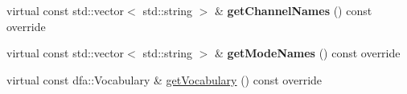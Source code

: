 \begin{DoxyCompactItemize}
\item 
\mbox{\label{classantlr4_1_1LexerInterpreter_ad1df0a3e75724e35cb71f0c9e5d97888}} 
virtual const std\+::vector$<$ std\+::string $>$ \& {\bfseries get\+Channel\+Names} () const override
\item 
\mbox{\label{classantlr4_1_1LexerInterpreter_ae00cc21c99716f97bac1a44305ecff0d}} 
virtual const std\+::vector$<$ std\+::string $>$ \& {\bfseries get\+Mode\+Names} () const override
\item 
virtual const dfa\+::\+Vocabulary \& \hyperlink{classantlr4_1_1LexerInterpreter_addd24350f968e05ba45f2c8490b16e9e}{get\+Vocabulary} () const override
\end{DoxyCompactItemize}

